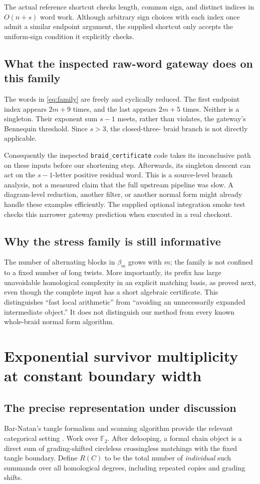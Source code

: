 \documentclass[11pt]{article}
\theoremstyle{definition}
\theoremstyle{remark}
\newcommand{\F}{\mathbb F}
\begin{document}
The actual reference shortcut checks length, common sign, and distinct
indices in $O(n+s)$ word work. Although arbitrary sign choices with each
index once admit a similar endpoint argument, the supplied shortcut only
accepts the uniform-sign condition it explicitly checks.

\subsection{What the inspected raw-word gateway does on this family}
The words in \eqref{eq:family} are freely and cyclically reduced. The first
endpoint index appears $2m+9$ times, and the last appears $2m+5$ times.
Neither is a singleton. Their exponent sum $s-1$ meets, rather than
violates, the gateway's Bennequin threshold. Since $s>3$, the closed-three-
braid branch is not directly applicable.

Consequently the inspected \texttt{braid\_certificate} code takes its
inconclusive path on these inputs before our shortening step. Afterwards,
its singleton descent can act on the $s-1$-letter positive residual word.
This is a source-level branch analysis, not a measured claim that the full
upstream pipeline was slow. A diagram-level reduction, another filter, or
another normal form might already handle these examples efficiently. The
supplied optional integration smoke test checks this narrower gateway
prediction when executed in a real checkout.

\subsection{Why the stress family is still informative}
The number of alternating blocks in $\beta_m$ grows with $m$; the family is
not confined to a fixed number of long twists. More importantly, its prefix
has large unavoidable homological complexity in an explicit matching basis,
as proved next, even though the complete input has a short algebraic
certificate. This distinguishes ``fast local arithmetic'' from ``avoiding
an unnecessarily expanded intermediate object.'' It does not distinguish
our method from every known whole-braid normal form algorithm.

\section{Exponential survivor multiplicity at constant boundary width}
\subsection{The precise representation under discussion}
Bar-Natan's tangle formalism and scanning algorithm provide the relevant
categorical setting \cite{bar-natan-tangles,bar-natan-fast}. Work over $\F_2$.
After delooping, a formal chain object is a direct sum of grading-shifted
circleless crossingless matchings with the fixed tangle boundary. Define
$R(C)$ to be the total number of \emph{individual} such summands over all
homological degrees, including repeated copies and grading shifts.
\end{document}
